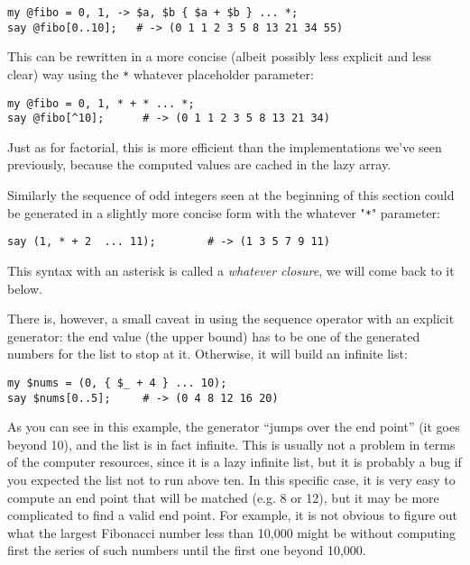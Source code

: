 \begin{verbatim}
my @fibo = 0, 1, -> $a, $b { $a + $b } ... *;
say @fibo[0..10];   # -> (0 1 1 2 3 5 8 13 21 34 55)
\end{verbatim}

This can be rewritten in a more concise (albeit possibly 
less explicit and less clear) way using the \verb'*' 
whatever placeholder parameter:

\begin{verbatim}
my @fibo = 0, 1, * + * ... *;
say @fibo[^10];      # -> (0 1 1 2 3 5 8 13 21 34)
\end{verbatim}

Just as for factorial, this is more efficient than the 
implementations we've seen previously, because the 
computed values are cached in the lazy array.

Similarly the sequence of odd integers seen at the 
beginning of this section could be generated in a 
slightly more concise form with the whatever "\verb'*'" 
parameter:

\begin{verbatim}
say (1, * + 2  ... 11);        # -> (1 3 5 7 9 11)
\end{verbatim}

This syntax with an asterisk is called a 
\emph{whatever closure}, we will come back to 
it below.

There is, however, a small caveat in using the sequence operator with 
an explicit generator: the end value (the upper bound) has 
to be one of the generated numbers for the list to stop at 
it. Otherwise, it will build an infinite list:

\begin{verbatim}
my $nums = (0, { $_ + 4 } ... 10);
say $nums[0..5];     # -> (0 4 8 12 16 20)
\end{verbatim}

As you can see in this example, the generator ``jumps over the end 
point'' (it goes beyond 10), and the list is 
in fact infinite. This is usually not a problem 
in terms of the computer resources, since it is 
a lazy infinite list, but it is probably a bug if 
you expected the list not to run above ten. In this 
specific case, it is very easy to compute an end 
point that will be matched (e.g. 8 or 12), but it may be 
more complicated to find a valid end point. For example, 
it is not obvious to figure out what the largest 
Fibonacci number less than 10,000 might be without 
computing first the series of such numbers until the 
first one beyond 10,000.

